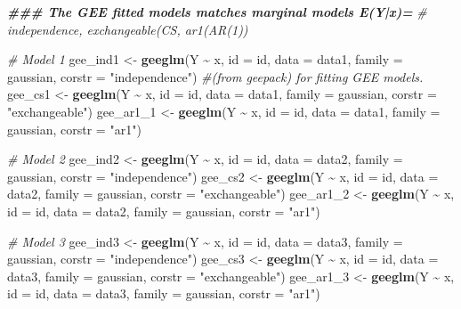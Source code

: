\documentclass[
]{article}
\newenvironment{Shaded}{\begin{snugshade}}{\end{snugshade}}
\newcommand{\AttributeTok}[1]{\textcolor[rgb]{0.13,0.29,0.53}{#1}}
\newcommand{\CommentTok}[1]{\textcolor[rgb]{0.56,0.35,0.01}{\textit{#1}}}
\newcommand{\DocumentationTok}[1]{\textcolor[rgb]{0.56,0.35,0.01}{\textbf{\textit{#1}}}}
\newcommand{\FunctionTok}[1]{\textcolor[rgb]{0.13,0.29,0.53}{\textbf{#1}}}
\newcommand{\NormalTok}[1]{#1}
\newcommand{\OtherTok}[1]{\textcolor[rgb]{0.56,0.35,0.01}{#1}}
\newcommand{\SpecialCharTok}[1]{\textcolor[rgb]{0.81,0.36,0.00}{\textbf{#1}}}
\newcommand{\StringTok}[1]{\textcolor[rgb]{0.31,0.60,0.02}{#1}}
\begin{document}
\begin{Shaded}
\begin{Highlighting}[]
\DocumentationTok{\#\#\# The GEE fitted models matches marginal models E(Y|x)=}
\CommentTok{\# independence, exchangeable(CS, ar1(AR(1))}

\CommentTok{\#  Model 1 }
\NormalTok{gee\_ind1 }\OtherTok{\textless{}{-}} \FunctionTok{geeglm}\NormalTok{(Y }\SpecialCharTok{\textasciitilde{}}\NormalTok{ x, }\AttributeTok{id =}\NormalTok{ id, }\AttributeTok{data =}\NormalTok{ data1, }\AttributeTok{family =}\NormalTok{ gaussian, }\AttributeTok{corstr =} \StringTok{"independence"}\NormalTok{) }\CommentTok{\#(from geepack) for fitting GEE models.}
\NormalTok{gee\_cs1  }\OtherTok{\textless{}{-}} \FunctionTok{geeglm}\NormalTok{(Y }\SpecialCharTok{\textasciitilde{}}\NormalTok{ x, }\AttributeTok{id =}\NormalTok{ id, }\AttributeTok{data =}\NormalTok{ data1, }\AttributeTok{family =}\NormalTok{ gaussian, }\AttributeTok{corstr =} \StringTok{"exchangeable"}\NormalTok{)}
\NormalTok{gee\_ar1\_1 }\OtherTok{\textless{}{-}} \FunctionTok{geeglm}\NormalTok{(Y }\SpecialCharTok{\textasciitilde{}}\NormalTok{ x, }\AttributeTok{id =}\NormalTok{ id, }\AttributeTok{data =}\NormalTok{ data1, }\AttributeTok{family =}\NormalTok{ gaussian, }\AttributeTok{corstr =} \StringTok{"ar1"}\NormalTok{)}

\CommentTok{\#  Model 2 }
\NormalTok{gee\_ind2 }\OtherTok{\textless{}{-}} \FunctionTok{geeglm}\NormalTok{(Y }\SpecialCharTok{\textasciitilde{}}\NormalTok{ x, }\AttributeTok{id =}\NormalTok{ id, }\AttributeTok{data =}\NormalTok{ data2, }\AttributeTok{family =}\NormalTok{ gaussian, }\AttributeTok{corstr =} \StringTok{"independence"}\NormalTok{)}
\NormalTok{gee\_cs2  }\OtherTok{\textless{}{-}} \FunctionTok{geeglm}\NormalTok{(Y }\SpecialCharTok{\textasciitilde{}}\NormalTok{ x, }\AttributeTok{id =}\NormalTok{ id, }\AttributeTok{data =}\NormalTok{ data2, }\AttributeTok{family =}\NormalTok{ gaussian, }\AttributeTok{corstr =} \StringTok{"exchangeable"}\NormalTok{)}
\NormalTok{gee\_ar1\_2 }\OtherTok{\textless{}{-}} \FunctionTok{geeglm}\NormalTok{(Y }\SpecialCharTok{\textasciitilde{}}\NormalTok{ x, }\AttributeTok{id =}\NormalTok{ id, }\AttributeTok{data =}\NormalTok{ data2, }\AttributeTok{family =}\NormalTok{ gaussian, }\AttributeTok{corstr =} \StringTok{"ar1"}\NormalTok{)}

\CommentTok{\#  Model 3 }
\NormalTok{gee\_ind3 }\OtherTok{\textless{}{-}} \FunctionTok{geeglm}\NormalTok{(Y }\SpecialCharTok{\textasciitilde{}}\NormalTok{ x, }\AttributeTok{id =}\NormalTok{ id, }\AttributeTok{data =}\NormalTok{ data3, }\AttributeTok{family =}\NormalTok{ gaussian, }\AttributeTok{corstr =} \StringTok{"independence"}\NormalTok{)}
\NormalTok{gee\_cs3  }\OtherTok{\textless{}{-}} \FunctionTok{geeglm}\NormalTok{(Y }\SpecialCharTok{\textasciitilde{}}\NormalTok{ x, }\AttributeTok{id =}\NormalTok{ id, }\AttributeTok{data =}\NormalTok{ data3, }\AttributeTok{family =}\NormalTok{ gaussian, }\AttributeTok{corstr =} \StringTok{"exchangeable"}\NormalTok{)}
\NormalTok{gee\_ar1\_3 }\OtherTok{\textless{}{-}} \FunctionTok{geeglm}\NormalTok{(Y }\SpecialCharTok{\textasciitilde{}}\NormalTok{ x, }\AttributeTok{id =}\NormalTok{ id, }\AttributeTok{data =}\NormalTok{ data3, }\AttributeTok{family =}\NormalTok{ gaussian, }\AttributeTok{corstr =} \StringTok{"ar1"}\NormalTok{)}



\end{Highlighting}
\end{Shaded}
\end{document}
